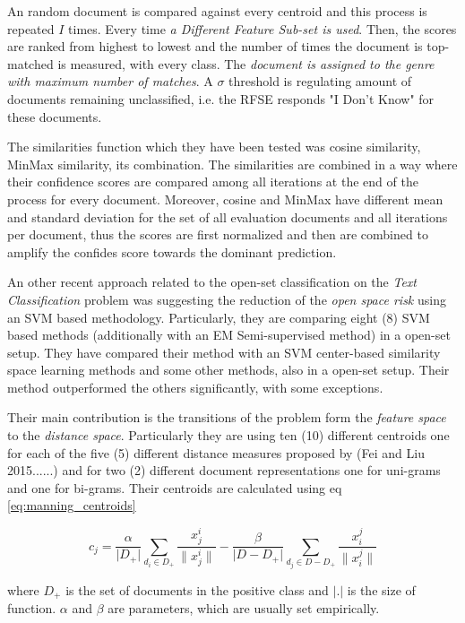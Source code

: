 An random document is compared against every centroid and this process is repeated $I$ times. Every time \textit{a Different Feature Sub-set is used}. Then, the scores are ranked from highest to lowest and the number of times the document is top-matched is measured, with every class. The \textit{document is assigned to the genre with maximum number of matches}. A $\sigma$ threshold is regulating amount of documents remaining unclassified, i.e. the RFSE responds "I Don't Know" for these documents.

The similarities function which they have been tested was cosine similarity, MinMax similarity, its combination. The similarities are combined in a way where their confidence scores are compared among all iterations at the end of the process for every document. Moreover, cosine and MinMax have different mean and standard deviation for the set of all evaluation documents and all iterations per document, thus the scores are first normalized and then are combined to amplify the confides score towards the dominant prediction.

An other recent approach related to the open-set classification on the \textit{Text Classification} problem was suggesting the reduction of the \textit{open space risk} using an SVM based methodology. Particularly, they are comparing eight (8) SVM based methods (additionally with an EM Semi-supervised method) in a open-set setup. They have compared their method with an  SVM center-based similarity space learning methods and some other methods, also in a open-set setup. Their method outperformed the others significantly, with some exceptions. 

Their main contribution is the transitions of the problem form the \textit{feature space} to the \textit{distance space}. Particularly they are using ten (10) different centroids one for each of the five (5) different distance measures proposed by (Fei and Liu 2015......) and for two (2) different document representations one for uni-grams and one for bi-grams. Their centroids are calculated using  eq \ref{eq:manning_centroids} 

\begin{equation}\label{eq:manning_centroids}
	c_{j} = \frac{\alpha}{\lvert D_{+} \rvert} \sum_{d_{i} \in D_{+}} \frac{x_{j}^{i}}{\lVert x_{j}^{i} \rVert } - \frac{\beta}{\lvert D - D_{+} \rvert} \sum_{d_{j} \in D - D_{+}} \frac{x_{i}^{j}}{\lVert x_{i}^{j} \rVert}
\end{equation}

where $D_{+}$ is the set of documents in the positive class and $\lvert . \rvert$ is the size of function. $\alpha$ and $\beta$ are parameters, which are usually set empirically.

